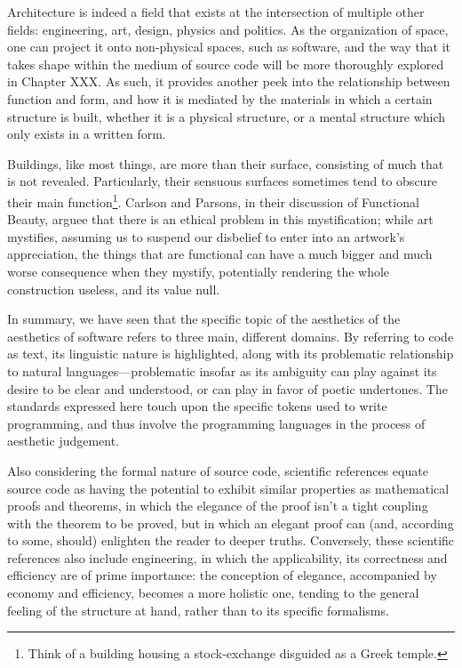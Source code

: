 Architecture is indeed a field that exists at the intersection of multiple other fields: engineering, art, design, physics and politics. As the organization of space, one can project it onto non-physical spaces, such as software, and the way that it takes shape within the medium of source code will be more thoroughly explored in Chapter XXX. As such, it provides another peek into the relationship between function and form, and how it is mediated by the materials in which a certain structure is built, whether it is a physical structure, or a mental structure which only exists in a written form.

Buildings, like most things, are more than their surface, consisting of much that is not revealed. Particularly, their sensuous surfaces sometimes tend to obscure their main function\footnote{Think of a building housing a stock-exchange disguided as a Greek temple.}. Carlson and Parsons, in their discussion of Functional Beauty, arguee that there is an ethical problem in this mystification; while art mystifies, assuming us to suspend our disbelief to enter into an artwork's appreciation, the things that are functional can have a much bigger and much worse consequence when they mystify, potentially rendering the whole construction useless, and its value null.

\vspace{1\baselineskip}

In summary, we have seen that the specific topic of the aesthetics of the aesthetics of software refers to three main, different domains. By referring to code as text, its linguistic nature is highlighted, along with its problematic relationship to natural languages—problematic insofar as its ambiguity can play against its desire to be clear and understood, or can play in favor of poetic undertones. The standards expressed here touch upon the specific tokens used to write programming, and thus involve the programming languages in the process of aesthetic judgement.

Also considering the formal nature of source code, scientific references equate source code as having the potential to exhibit similar properties as mathematical proofs and theorems, in which the elegance of the proof isn't a tight coupling with the theorem to be proved, but in which an elegant proof can (and, according to some, should) enlighten the reader to deeper truths. Conversely, these scientific references also include engineering, in which the applicability, its correctness and efficiency are of prime importance: the conception of elegance, accompanied by economy and efficiency, becomes a more holistic one, tending to the general feeling of the structure at hand, rather than to its specific formalisms.

